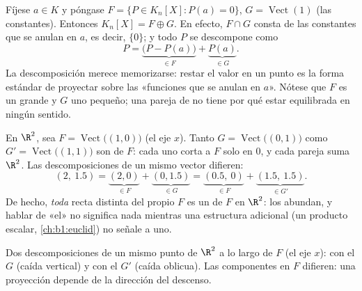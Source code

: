 \begin{example}
\label{ex:b1:vspaces:hyperplane}
Fíjese $a \in K$ y póngase $F = \{P \in K_n[X] : P(a) = 0\}$,
$G = \operatorname{Vect}(1)$ (las constantes). Entonces
$K_n[X] = F \oplus G$. En efecto, $F \cap G$ consta de las constantes
que se anulan en $a$, es decir, $\{0\}$; y todo $P$ se descompone como
\[
P = \underbrace{\bigl(P - P(a)\bigr)}_{\in F}
+ \underbrace{P(a)}_{\in G} .
\]
La descomposición merece memorizarse: restar el valor en un punto es
la forma estándar de proyectar sobre las «funciones que se anulan en
$a$». Nótese que $F$ es un  grande y $G$ uno pequeño; una
pareja de  no tiene por qué estar equilibrada en
ningún sentido.
\end{example}

\begin{example}
\label{ex:b1:vspaces:manysupplements}
En $\R^2$, sea $F = \operatorname{Vect}\bigl((1,0)\bigr)$ (el eje
$x$). Tanto $G = \operatorname{Vect}\bigl((0,1)\bigr)$ como
$G' = \operatorname{Vect}\bigl((1,1)\bigr)$ son  de
$F$: cada uno corta a $F$ solo en $0$, y cada pareja suma $\R^2$. Las
descomposiciones de un mismo vector difieren:
\[
(2,\ 1.5) = \underbrace{(2, 0)}_{\in F} +
\underbrace{(0, 1.5)}_{\in G}
= \underbrace{(0.5,\ 0)}_{\in F} +
\underbrace{(1.5,\ 1.5)}_{\in G'} .
\]
De hecho, \emph{toda} recta distinta del propio $F$ es un
 de $F$ en $\R^2$: los  abundan, y
hablar de «el»  no significa nada mientras una
estructura adicional (un producto escalar, \cref{ch:b1:euclid}) no
señale a uno.
\end{example}

\begin{omfigure}

{\small Dos descomposiciones de un mismo punto de $\R^2$ a lo largo
de $F$ (el eje $x$): con el  $G$ (caída vertical) y con
el  $G'$ (caída oblicua). Las componentes en $F$
difieren: una proyección depende de la dirección del descenso.}
\end{omfigure}

